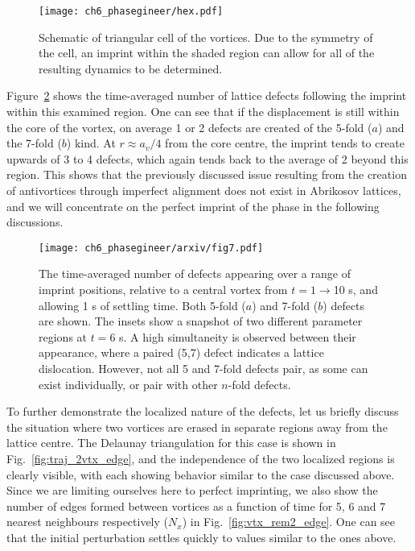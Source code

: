 \begin{figure}\centering
    \texttt{[image: ch6\_phasegineer/hex.pdf]}
    \caption{Schematic of triangular cell of the vortices. Due to the symmetry of the cell, an imprint within the shaded region can allow for all of the resulting dynamics to be determined.} \label{fig:hex}
\end{figure}

Figure~\ref{fig:lattice_misalign} shows the time-averaged number of lattice defects following the imprint within this examined region. One can see that if the displacement is still within the core of the vortex, on average 1 or 2 defects are created of the 5-fold ($a$) and the 7-fold ($b$) kind. At $r\approx a_v/4$ from the core centre, the imprint tends to create upwards of 3 to 4 defects, which again tends back to the average of 2 beyond this region. This shows that the previously discussed issue resulting from the creation of antivortices through imperfect alignment does not exist in Abrikosov lattices, and we will concentrate on the perfect imprint of the phase in the following discussions.

\begin{figure}\centering
    \texttt{[image: ch6\_phasegineer/arxiv/fig7.pdf]}
    \caption{The time-averaged number of defects appearing over a range of imprint positions, relative to a central vortex from $t=1\rightarrow$10 s, and allowing 1 s of settling time. Both 5-fold ($a$) and 7-fold ($b$) defects are shown. The insets show a snapshot of two different parameter regions at $t=6$ s. A high simultaneity is observed between their appearance, where a paired (5,7) defect indicates a lattice dislocation. However, not all 5 and 7-fold defects pair, as some can exist individually, or pair with other $n$-fold defects.} \label{fig:lattice_misalign}
\end{figure}

To further demonstrate the localized nature of the defects, let us briefly discuss the situation where two vortices are erased in separate regions away from the lattice centre. The Delaunay triangulation for this case is shown in Fig.~\ref{fig:traj_2vtx_edge}, and the independence of the two localized regions is clearly visible, with each showing behavior similar to the case discussed above. Since we are limiting ourselves here to perfect imprinting, we also show the number of edges formed between vortices as a function of time for 5, 6 and 7 nearest neighbours respectively ($N_x$) in Fig.~\ref{fig:vtx_rem2_edge}. One can see that the initial perturbation settles quickly to values similar to the ones above.

